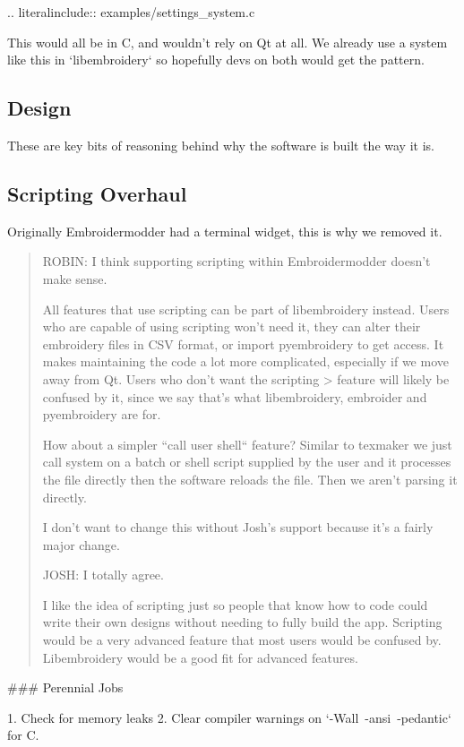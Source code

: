 .. literalinclude:: examples/settings\_system.c

This would all be in C, and wouldn't rely on Qt at all. We already use a
system like this in `libembroidery` so hopefully devs on both
would get the pattern.

\subsection{Design}

These are key bits of reasoning behind why the software is built the way it is.

\subsection{Scripting Overhaul}

Originally Embroidermodder had a terminal widget, this is why we removed it.

\begin{quote}
ROBIN: I think supporting scripting within Embroidermodder doesn't make
sense.

All features that use scripting can be part of libembroidery instead.
Users who are capable of using scripting won't need it, they can alter
their embroidery files in CSV format, or import pyembroidery to get
access. It makes maintaining the code a lot more complicated, especially
if we move away from Qt. Users who don't want the scripting > feature will
likely be confused by it, since we say that's what  libembroidery,
embroider and pyembroidery are for.

How about a simpler ``call user shell`` feature? Similar to texmaker we
just call system on a batch or shell script supplied by the user and it
processes the file directly then the software reloads the file. Then we
aren't parsing it directly.

I don't want to change this without Josh's support because it's a fairly
major change.

JOSH: I totally agree.

I like the idea of scripting just so people that know how to code could
write their own designs without needing to fully build the app.
Scripting would be a very advanced feature that most users would be
confused by. Libembroidery would be a good fit for advanced features.
\end{quote}

### Perennial Jobs

1. Check for memory leaks
2. Clear compiler warnings on `-Wall\ -ansi\ -pedantic` for C.

